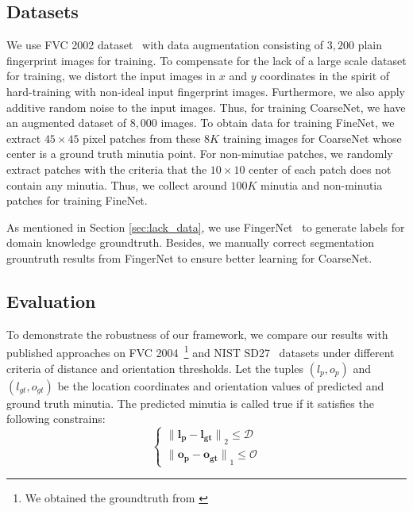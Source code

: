 \documentclass[10pt,twocolumn,letterpaper]{article}
\begin{document}
\subsection{Datasets}
We use FVC 2002 dataset~\cite{maio2002fvc2002} with data augmentation consisting of $3,200$ plain fingerprint images for training. To compensate for the lack of a large scale dataset for training, we distort the input images in $x$ and $y$ coordinates in the spirit of hard-training with non-ideal input fingerprint images. Furthermore, we also apply additive random noise to the input images. Thus, for training CoarseNet, we have an augmented dataset of $8,000$ images. To obtain data for training FineNet, we extract $45 \times 45$ pixel patches from these $8K$ training images for CoarseNet whose center is a ground truth minutia point. For non-minutiae patches, we randomly extract patches with the criteria that the $10 \times 10$ center of each patch does not contain any minutia. Thus, we collect around $100K$ minutia and non-minutia patches for training FineNet.

As mentioned in Section \ref{sec:lack_data}, we use FingerNet~\cite{tang2017FingerNet} to generate labels for domain knowledge groundtruth. Besides, we manually correct segmentation grountruth results from FingerNet to ensure better learning for CoarseNet.
\vspace{-1mm}
\subsection{Evaluation}

To demonstrate the robustness of our framework, we compare our results with published approaches on FVC 2004~\cite{maio2004fvc2004}\footnote{We obtained the groundtruth from \cite{kayaoglu2013standard}} and NIST SD27~\cite{garris2000nist} datasets under different criteria of distance and orientation thresholds. Let the tuples $(l_p,o_p)$ and $(l_{gt},o_{gt})$ be the location coordinates and orientation values of predicted and ground truth minutia. The predicted minutia is called true if it satisfies the following constrains:
\vspace{-2mm}
\begin{equation}
\label{eq:D_O}
\begin{cases}
{\lVert \mathbf{l_p-l_{gt}} \rVert}_2 \leq \mathcal{D}   \\
{\lVert \mathbf{o_p-o_{gt}} \rVert}_1 \leq \mathcal{O}
\end{cases}
\end{equation}
\end{document}
